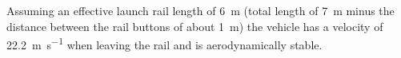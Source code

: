 Assuming an effective launch rail length of \SI{6}{\meter} (total length of \SI{7}{\meter} minus the distance between the rail buttons of about \SI{1}{\meter}) the vehicle has a velocity of \SI{22.2}{\meter\per\second} when leaving the rail and is aerodynamically stable.



\newpage



\newpage



\newpage



\newpage



\newpage



\newpage

